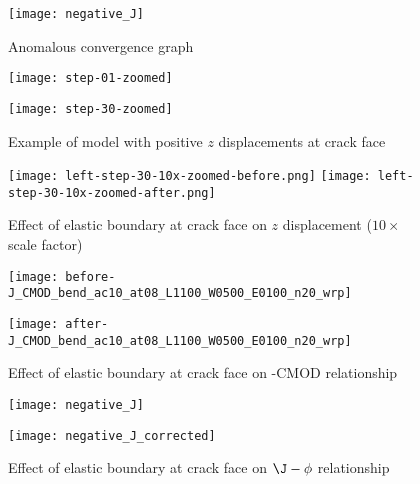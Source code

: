 \begin{figure}[tbp]
\centering
\texttt{[image: negative\_J]}
\caption{\label{fig:negative_J} Anomalous \J convergence graph}
\end{figure}

\begin{figure}[tbp]
\centering
\begin{minipage}{0.45\columnwidth}
\texttt{[image: step-01-zoomed]}
\end{minipage}
\begin{minipage}{0.45\columnwidth}
\texttt{[image: step-30-zoomed]}
\end{minipage}
\caption{\label{fig:positive-displacements} Example of model with positive \(z\) displacements at crack face}
\end{figure}

\begin{figure}[tbp]
\centering
\texttt{[image: left-step-30-10x-zoomed-before.png]}
\texttt{[image: left-step-30-10x-zoomed-after.png]}
\caption{\label{fig:elastic-boundary-displacement} Effect of elastic boundary at crack face on \(z\) displacement (\(10\times\) scale factor)}
\end{figure}

\begin{figure}[tbp]
\centering
\begin{minipage}{0.45\columnwidth}
\texttt{[image: before-J\_CMOD\_bend\_ac10\_at08\_L1100\_W0500\_E0100\_n20\_wrp]}
\end{minipage}
\begin{minipage}{0.45\columnwidth}
\texttt{[image: after-J\_CMOD\_bend\_ac10\_at08\_L1100\_W0500\_E0100\_n20\_wrp]}
\end{minipage}
\caption{\label{fig:elastic-boundary-J-CMOD} Effect of elastic boundary at crack face on \J-CMOD relationship}
\end{figure}

\begin{figure}[tbp]
\centering
\begin{minipage}{0.45\columnwidth}
\texttt{[image: negative\_J]}
\end{minipage}
\begin{minipage}{0.45\columnwidth}
\texttt{[image: negative\_J\_corrected]}
\end{minipage}
\caption{\label{fig:elastic-boundary-J-phi} Effect of elastic boundary at crack face on \(\J-\phi\) relationship}
\end{figure}

